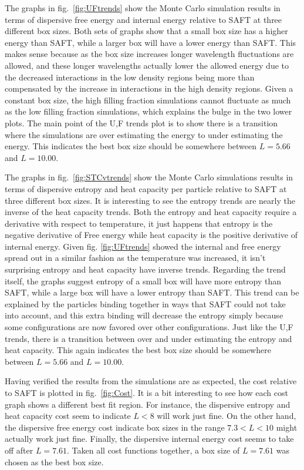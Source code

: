 ﻿%
The graphs in fig.~\ref{fig:UFtrends} show the Monte Carlo simulation results in terms of dispersive free energy and internal energy relative to SAFT at three different box sizes. Both sets of graphs show that a small box size has a higher energy than SAFT, while a larger box will have a lower energy than SAFT. This makes sense because as the box size increases longer wavelength fluctuations are allowed, and these longer wavelengths actually lower the allowed energy due to the decreased interactions in the low density regions being more than compensated by the increase in interactions in the high density regions. Given a constant box size, the high filling fraction simulations cannot fluctuate as much as the low filling fraction simulations, which explains the bulge in the two lower plots. The main point of the U,F trends plot is to show there is a transition where the simulations are over estimating the energy to under estimating the energy. This indicates the best box size should be somewhere between $L=5.66$ and $L=10.00$.

The graphs in fig.~\ref{fig:STCvtrends} show the Monte Carlo simulations results in terms of dispersive entropy and heat capacity per particle relative to SAFT at three different box sizes. It is interesting to see the entropy trends are nearly the inverse of the heat capacity trends. Both the entropy and heat capacity require a derivative with respect to temperature, it just happens that entropy is the negative derivative of Free energy while heat capacity is the positive derivative of internal energy. Given fig. \ref{fig:UFtrends} showed the internal and free energy spread out in a similar fashion as the temperature was increased, it isn't surprising entropy and heat capacity have inverse trends. Regarding the trend itself, the graphs suggest entropy of a small box will have more entropy than SAFT, while a large box will have a lower entropy than SAFT. This trend can be explained by the particles binding together in ways that SAFT could not take into account, and this extra binding will decrease the entropy simply because some configurations are now favored over other configurations. Just like the U,F trends, there is a transition between over and under estimating the entropy and heat capacity. This again indicates the best box size should be somewhere between $L=5.66$ and $L=10.00$.

Having verified the results from the simulations are as expected, the cost relative to SAFT is plotted in fig.~\ref{fig:Cost}. It is a bit interesting to see how each cost graph shows a different best fit region. For instance, the dispersive entropy and heat capacity cost seem to indicate $L<8$ will work just fine. On the other hand, the dispersive free energy cost indicate box sizes in the range $7.3<L<10$ might actually work just fine. Finally, the dispersive internal energy cost seems to take off after $L=7.61$. Taken all cost functions together, a box size of $L=7.61$ was chosen as the best box size.

